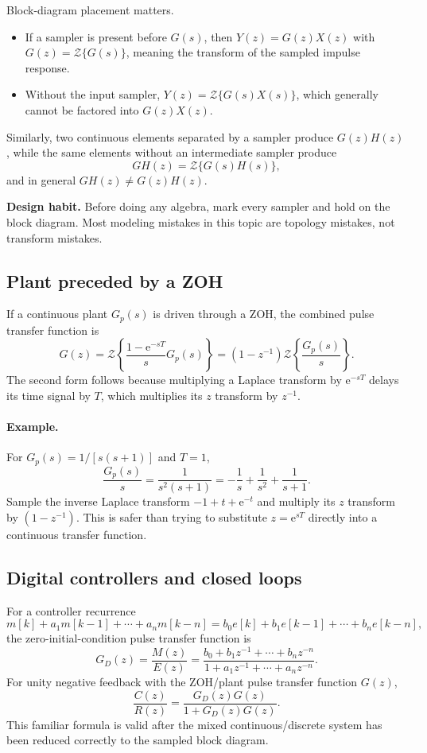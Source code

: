 \documentclass[11pt]{article}
\newcommand{\Z}{\mathcal{Z}}
\newcommand{\e}{\mathrm{e}}
\begin{document}
Block-diagram placement matters.
\begin{itemize}
  \item If a sampler is present before $G(s)$, then $Y(z)=G(z)X(z)$ with $G(z)=\Z\{G(s)\}$, meaning the transform of the sampled impulse response.
  \item Without the input sampler, $Y(z)=\Z\{G(s)X(s)\}$, which generally cannot be factored into $G(z)X(z)$.
\end{itemize}
Similarly, two continuous elements separated by a sampler produce $G(z)H(z)$, while the same elements without an intermediate sampler produce
\[
GH(z)=\Z\{G(s)H(s)\},
\]
and in general $GH(z)\ne G(z)H(z)$.

\textbf{Design habit.} Before doing any algebra, mark every sampler and hold on the block diagram. Most modeling mistakes in this topic are topology mistakes, not transform mistakes.

\subsection{Plant preceded by a ZOH}

If a continuous plant $G_p(s)$ is driven through a ZOH, the combined pulse transfer function is
\[
G(z)=\Z\left\{\frac{1-\e^{-sT}}{s}G_p(s)\right\}
=(1-z^{-1})\Z\left\{\frac{G_p(s)}{s}\right\}.
\]
The second form follows because multiplying a Laplace transform by $\e^{-sT}$ delays its time signal by $T$, which multiplies its $z$ transform by $z^{-1}$.

\paragraph{Example.} For $G_p(s)=1/[s(s+1)]$ and $T=1$,
\[
\frac{G_p(s)}{s}=\frac{1}{s^2(s+1)}
=-\frac{1}{s}+\frac{1}{s^2}+\frac{1}{s+1}.
\]
Sample the inverse Laplace transform $-1+t+\e^{-t}$ and multiply its $z$ transform by $(1-z^{-1})$. This is safer than trying to substitute $z=\e^{sT}$ directly into a continuous transfer function.

\subsection{Digital controllers and closed loops}

For a controller recurrence
\[
m[k]+a_1m[k-1]+\cdots+a_nm[k-n]
=b_0e[k]+b_1e[k-1]+\cdots+b_ne[k-n],
\]
the zero-initial-condition pulse transfer function is
\[
G_D(z)=\frac{M(z)}{E(z)}
=\frac{b_0+b_1z^{-1}+\cdots+b_nz^{-n}}
{1+a_1z^{-1}+\cdots+a_nz^{-n}}.
\]
For unity negative feedback with the ZOH/plant pulse transfer function $G(z)$,
\[
\frac{C(z)}{R(z)}=\frac{G_D(z)G(z)}{1+G_D(z)G(z)}.
\]
This familiar formula is valid after the mixed continuous/discrete system has been reduced correctly to the sampled block diagram.
\end{document}
